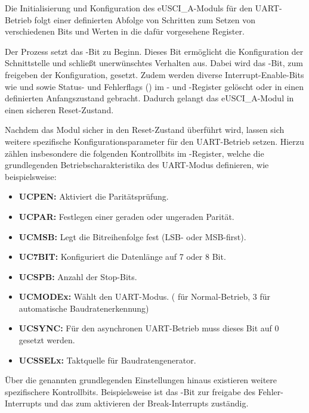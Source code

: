 Die Initialisierung und Konfiguration des eUSCI\_A-Moduls f\"ur den UART-Betrieb folgt einer definierten Abfolge von Schritten zum Setzen von verschiedenen Bits und Werten in die daf\"ur vorgesehene Register. 

\newpage
Der Prozess setzt das -Bit zu Beginn. Dieses Bit erm\"oglicht die Konfiguration der Schnittstelle und schlie{\ss}t unerw\"unschtes Verhalten aus. Dabei wird das -Bit, zum freigeben der Konfiguration, gesetzt. Zudem werden diverse Interrupt-Enable-Bits wie  und  sowie Status- und Fehlerflags () im - und -Register gel\"oscht oder in einen definierten Anfangszustand gebracht. Dadurch gelangt das eUSCI\_A-Modul in einen sicheren Reset-Zustand. 

Nachdem das Modul sicher in den Reset-Zustand \"uberf\"uhrt wird, lassen sich weitere spezifische Konfigurationsparameter f\"ur den UART-Betrieb setzen. Hierzu z\"ahlen insbesondere die folgenden Kontrollbits im -Register, welche die grundlegenden Betriebscharakteristika des UART-Modus definieren, wie beispielsweise:

\begin{itemize}
	\item \textbf{UCPEN:} Aktiviert die Parit\"atspr\"ufung.
	\item \textbf{UCPAR:} Festlegen einer geraden oder ungeraden Parit\"at.
	\item \textbf{UCMSB:} Legt die Bitreihenfolge fest (LSB- oder MSB-first).
	\item \textbf{UC7BIT:} Konfiguriert die Datenl\"ange auf 7 oder 8 Bit.
	\item \textbf{UCSPB:} Anzahl der Stop-Bits.
	\item \textbf{UCMODEx:} W\"ahlt den UART-Modus. ( f\"ur Normal-Betrieb, 3 f\"ur  automatische Baudratenerkennung)
	\item \textbf{UCSYNC:} F\"ur den asynchronen UART-Betrieb muss dieses Bit auf 0 gesetzt werden.
	\item \textbf{UCSSELx:} Taktquelle f\"ur Baudratengenerator.
\end{itemize}

\"Uber die genannten grundlegenden Einstellungen hinaus existieren weitere spezifischere Kontrollbits. Beispielsweise ist das -Bit zur freigabe des Fehler-Interrupts und das  zum aktivieren der Break-Interrupts zust\"andig. 

